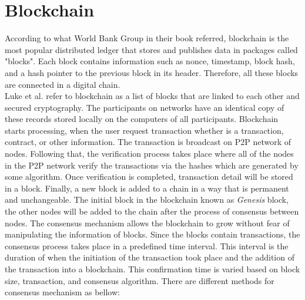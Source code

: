 \section{Blockchain} According to what World Bank Group \cite{DLT} in their book referred, blockchain is the most popular distributed ledger that stores and publishes data in packages called "blocks". Each block contains information such as nonce, timestamp, block hash, and a hash pointer to the previous block in its header. Therefore, all these blocks are connected in a digital chain\cite{DLT}. \\
Luke et al.\cite{Luke} refer to blockchain as a list of blocks that are linked to each other and secured cryptography. The participants on networks have an identical copy of these records stored locally on the computers of all participants. Blockchain starts processing, when the user request transaction whether is a transaction, contract, or other information. The transaction is broadcast on P2P network of nodes. Following that, the verification process takes place where all of the nodes in the P2P network verify the transactions via the hashes which are generated by some algorithm. Once verification is completed, transaction detail will be stored in a block. Finally, a new block is added to a chain in a way that is permanent and unchangeable\cite{Luke}. The initial block in the blockchain known as \textit{Genesis} block, the other nodes will be added to the chain after the process of consensus between nodes. The consensus mechanism allows the blockchain to grow without fear of manipulating the information of blocks. Since the blocks contain transactions, the consensus process takes place in a predefined time interval. This interval is the duration of when the initiation of the transaction took place and the addition of the transaction into a blockchain. This confirmation time is varied based on block size, transaction, and consensus algorithm. There are different methods for consensus mechanism as bellow: 
